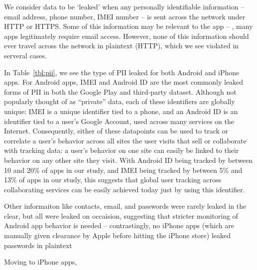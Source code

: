   We consider data to be `leaked' when any personally identifiable information -- email address, phone number, IMEI number -- is sent across the network under HTTP or HTTPS.
  Some of this information may be relevant to the app -- \eg{}, many apps legitimately require email access. 
  However, none of this information should ever travel across the network in plaintext (HTTP), which we see violated in serveral cases.

  In Table~\ref{tbl:pii}, we see the type of PII leaked for both Android and iPhone apps.
  For Android apps, IMEI and Android ID are the most commonly leaked forms of PII in both the Google Play and third-party dataset.
  Although not popularly thought of as ``private'' data, each of these identifiers are globally unique: IMEI is a unique identifier tied to a phone, and an Android ID is an identifier tied to a user's Google Account, used across many services on the Internet. 
  Consequently, either of these datapoints can be used to track or correlate a user's behavior across all sites the user visits that sell or collaborate with tracking data: a user's behavior on one site can easily be linked to their behavior on any other site they visit.
  With Android ID being tracked by between 10 and 20\% of apps in our study, and IMEI being tracked by between 5\% and 13\% of apps in our study, this suggests that global user tracking across collaborating services can be easily achieved today just by using this identifier.

  Other informaiton like contacts, email, and passwords were rarely leaked in the clear, but all were leaked on occaision, suggesting that stricter monitoring of Android app behavior is needed -- contrastingly, no iPhone apps (which are manually given clearance by Apple before hitting the iPhone store) leaked passwords in plaintext~

  Moving to iPhone apps, 





